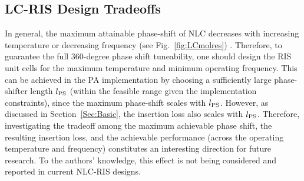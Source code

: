 
\subsection{LC-RIS Design Tradeoffs}

In general, the maximum attainable phase-shift  of \gls{NLC} decreases with increasing temperature or decreasing frequency (see Fig.~\ref{fig:LCmolres}) \cite{tesmer2021temperature}. Therefore, to guarantee the full $360$-degree phase shift tuneability, one should design the \gls{RIS} unit cells for the maximum temperature and minimum operating frequency. This can be achieved in the \gls{PA} implementation by choosing a sufficiently large phase-shifter length $l_{\rm PS}$ (within the feasible range given the implementation constraints), since  the maximum phase-shift scales with $l_{\rm PS}$. However, as discussed in Section~\ref{Sec:Basic}, the insertion loss also scales with $l_{\rm PS}$.
Therefore, investigating the tradeoff among the maximum achievable phase shift, the resulting insertion loss, and the achievable performance (across the operating temperature and frequency) constitutes an interesting direction for future research.
To the authors' knowledge, this effect is not being considered and reported in current \gls{NLC}-\gls{RIS} designs.



